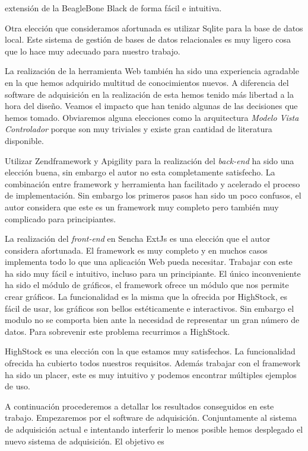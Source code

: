 	extensión de la BeagleBone Black de forma fácil e intuitiva.    
	\par
	Otra elección que consideramos afortunada es utilizar Sqlite\cite{Sqlite} para la base de datos local. Este sistema de gestión de bases de
	datos relacionales es muy ligero cosa que lo hace muy adecuado para nuestro trabajo.
	\par
	La realización de la herramienta Web también ha sido una experiencia agradable en la que hemos adquirido multitud de conocimientos nuevos. A
	diferencia del software de adquisición en la realización de esta hemos tenido más libertad a la hora del diseño. Veamos el impacto que han
	tenido algunas de las decisiones que hemos tomado. Obviaremos alguna elecciones como la arquitectura \emph{Modelo Vista Controlador} porque
	son muy triviales y existe gran cantidad de literatura disponible.
	\par
	Utilizar Zendframework y Apigility para la realización del \emph{back-end} ha sido una elección buena, sin embargo el autor no esta
	completamente satisfecho. La combinación entre framework y herramienta han facilitado y acelerado el proceso de implementación. Sin embargo
	los primeros pasos han sido un poco confusos, el autor considera que este es un framework muy completo pero también muy complicado para
	principiantes.
	\par
	La realización del \emph{front-end} en Sencha ExtJs es una elección que el autor considera afortunada. El framework es muy completo y en
	muchos casos implementa todo lo que una aplicación Web pueda necesitar. Trabajar con este ha sido muy fácil e intuitivo, incluso para un
	principiante. El único inconveniente ha sido el módulo de gráficos, el framework ofrece un módulo que nos permite crear gráficos. La
	funcionalidad es la misma que la ofrecida por HighStock, es fácil de usar, los gráficos son bellos estéticamente e interactivos. Sin embargo
	el modulo no se comporta bien ante la necesidad de representar un gran número de datos. Para sobrevenir este problema recurrimos a HighStock.
	\par
	HighStock es una elección con la que estamos muy satisfechos. La funcionalidad ofrecida ha cubierto todos nuestros requisitos. Además trabajar
	con el framework ha sido un placer, este es muy intuitivo y podemos encontrar múltiples ejemplos de uso.
	\par
	A continuación procederemos a detallar los resultados conseguidos en este trabajo. Empezaremos por el software de adquisición. Conjuntamente
	al sistema de adquisición actual e intentando interferir lo menos posible hemos desplegado el nuevo sistema de adquisición. El objetivo es
